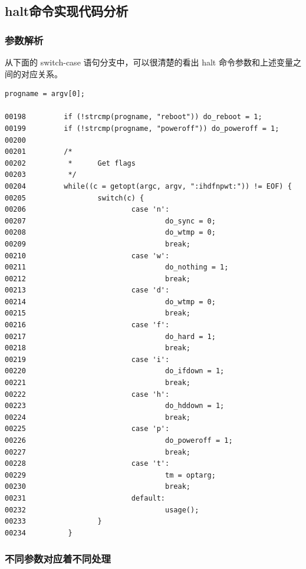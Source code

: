 \subsection{halt命令实现代码分析}

\subsubsection{参数解析}

从下面的 switch-case 语句分支中，可以很清楚的看出 halt
命令参数和上述变量之间的对应关系。

{\begin{shaded}\begin{verbatim}
progname = argv[0];

00198         if (!strcmp(progname, "reboot")) do_reboot = 1;
00199         if (!strcmp(progname, "poweroff")) do_poweroff = 1;
00200 
00201         /*
00202          *      Get flags
00203          */
00204         while((c = getopt(argc, argv, ":ihdfnpwt:")) != EOF) {
00205                 switch(c) {
00206                         case 'n':
00207                                 do_sync = 0;
00208                                 do_wtmp = 0;
00209                                 break;
00210                         case 'w':
00211                                 do_nothing = 1;
00212                                 break;
00213                         case 'd':
00214                                 do_wtmp = 0;
00215                                 break;
00216                         case 'f':
00217                                 do_hard = 1;
00218                                 break;
00219                         case 'i':
00220                                 do_ifdown = 1;
00221                                 break;
00222                         case 'h':
00223                                 do_hddown = 1;
00224                                 break;
00225                         case 'p':
00226                                 do_poweroff = 1;
00227                                 break;
00228                         case 't':
00229                                 tm = optarg;
00230                                 break;
00231                         default:
00232                                 usage();
00233                 }
00234          }
\end{verbatim}\end{shaded}}
\subsubsection{不同参数对应着不同处理}

